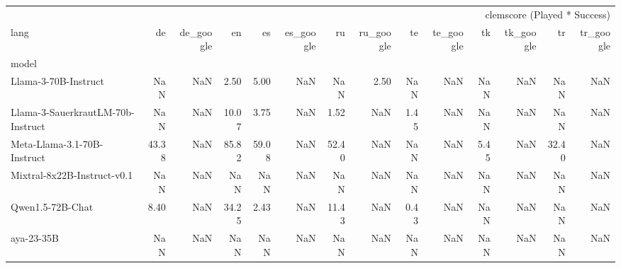 \begin{tabular}{lrrrrrrrrrrrrr}
\toprule
 & \multicolumn{13}{r}{clemscore (Played * Success)} \\
lang & de & de_google & en & es & es_google & ru & ru_google & te & te_google & tk & tk_google & tr & tr_google \\
model &  &  &  &  &  &  &  &  &  &  &  &  &  \\
\midrule
Llama-3-70B-Instruct & NaN & NaN & 2.50 & 5.00 & NaN & NaN & 2.50 & NaN & NaN & NaN & NaN & NaN & NaN \\
Llama-3-SauerkrautLM-70b-Instruct & NaN & NaN & 10.07 & 3.75 & NaN & 1.52 & NaN & 1.45 & NaN & NaN & NaN & NaN & NaN \\
Meta-Llama-3.1-70B-Instruct & 43.38 & NaN & 85.82 & 59.08 & NaN & 52.40 & NaN & NaN & NaN & 5.45 & NaN & 32.40 & NaN \\
Mixtral-8x22B-Instruct-v0.1 & NaN & NaN & NaN & NaN & NaN & NaN & NaN & NaN & NaN & NaN & NaN & NaN & NaN \\
Qwen1.5-72B-Chat & 8.40 & NaN & 34.25 & 2.43 & NaN & 11.43 & NaN & 0.43 & NaN & NaN & NaN & NaN & NaN \\
aya-23-35B & NaN & NaN & NaN & NaN & NaN & NaN & NaN & NaN & NaN & NaN & NaN & NaN & NaN \\
\bottomrule
\end{tabular}

